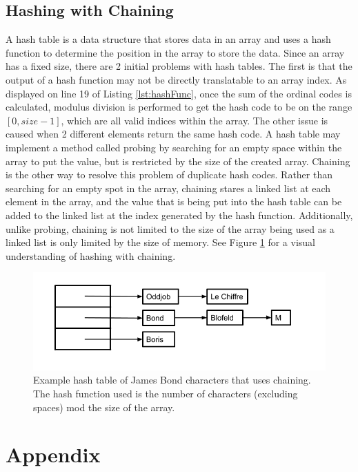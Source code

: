 \documentclass[letterpaper, 10pt,DIV=13]{scrartcl}
\numberwithin{equation}{section} %
\numberwithin{figure}{section} %
\numberwithin{table}{section} %
\begin{document}
\subsection{Hashing with Chaining}
A hash table is a data structure that stores data in an array and uses a hash function to determine the position in the array to store the data. Since an array has a fixed size, there are 2 initial problems with hash tables. The first is that the output of a hash function may not be directly translatable to an array index. As displayed on line 19 of Listing \ref{lst:hashFunc}, once the sum of the ordinal codes is calculated, modulus division is performed to get the hash code to be on the range $[0, size - 1]$, which are all valid indices within the array. The other issue is caused when 2 different elements return the same hash code. A hash table may implement a method called probing by searching for an empty space within the array to put the value, but is restricted by the size of the created array. Chaining is the other way to resolve this problem of duplicate hash codes. Rather than searching for an empty spot in the array, chaining stares a linked list at each element in the array, and the value that is being put into the hash table can be added to the linked list at the index generated by the hash function. Additionally, unlike probing, chaining is not limited to the size of the array being used as a linked list is only limited by the size of memory. See Figure \ref{figure:hashing} for a visual understanding of hashing with chaining.

\begin{figure}[ht] 
  \centering 
  \includegraphics[width=15cm]{hashing}
  \caption{Example hash table of James Bond characters that uses chaining. The hash function used is the number of characters (excluding spaces) mod the size of the array.}
  \label{figure:hashing}
\end{figure}

\section{Appendix}
\end{document}

